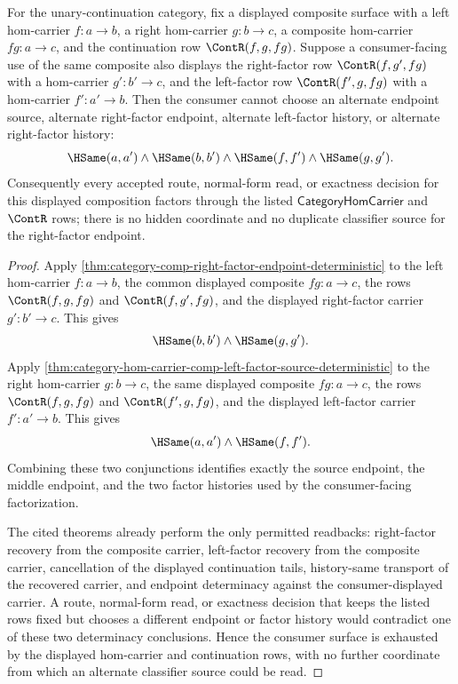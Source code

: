 \begin{corollary}
\label{cor:category-hom-carrier-comp-right-factor-endpoint-consumer-determinacy}
For the unary-continuation category, fix a displayed composite surface with a
left hom-carrier $f:a\to b$, a right hom-carrier $g:b\to c$, a composite
hom-carrier $fg:a\to c$, and the continuation row $\ContR(f,g,fg)$. Suppose a
consumer-facing use of the same composite also displays the right-factor row
$\ContR(f,g',fg)$ with a hom-carrier $g':b'\to c$, and the left-factor row
$\ContR(f',g,fg)$ with a hom-carrier $f':a'\to b$. Then the consumer cannot
choose an alternate endpoint source, alternate right-factor endpoint, alternate
left-factor history, or alternate right-factor history:
$$
\HSame(a,a')\wedge\HSame(b,b')\wedge\HSame(f,f')\wedge\HSame(g,g').
$$
Consequently every accepted route, normal-form read, or exactness decision for
this displayed composition factors through the listed $\mathsf{CategoryHomCarrier}$
and $\ContR$ rows; there is no hidden coordinate and no duplicate classifier
source for the right-factor endpoint.
\end{corollary}
\begin{proof}
Apply \autoref{thm:category-comp-right-factor-endpoint-deterministic} to the
left hom-carrier $f:a\to b$, the common displayed composite
$fg:a\to c$, the rows $\ContR(f,g,fg)$ and $\ContR(f,g',fg)$, and the displayed
right-factor carrier $g':b'\to c$. This gives
$$
\HSame(b,b')\wedge\HSame(g,g').
$$
Apply \autoref{thm:category-hom-carrier-comp-left-factor-source-deterministic}
to the right hom-carrier $g:b\to c$, the same displayed composite
$fg:a\to c$, the rows $\ContR(f,g,fg)$ and $\ContR(f',g,fg)$, and the displayed
left-factor carrier $f':a'\to b$. This gives
$$
\HSame(a,a')\wedge\HSame(f,f').
$$
Combining these two conjunctions identifies exactly the source endpoint, the
middle endpoint, and the two factor histories used by the consumer-facing
factorization.

The cited theorems already perform the only permitted readbacks: right-factor
recovery from the composite carrier, left-factor recovery from the composite
carrier, cancellation of the displayed continuation tails, history-same
transport of the recovered carrier, and endpoint determinacy against the
consumer-displayed carrier. A route, normal-form read, or exactness decision
that keeps the listed rows fixed but chooses a different endpoint or factor
history would contradict one of these two determinacy conclusions. Hence the
consumer surface is exhausted by the displayed hom-carrier and continuation
rows, with no further coordinate from which an alternate classifier source
could be read.
\end{proof}
